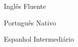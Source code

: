 

\begin{cvskills}

  \cvskill
    {Inglês} %
    {Fluente} %

  \cvskill
    {Português} %
    {Nativo} %

  \cvskill
    {Espanhol} %
    {Intermediário} %

\end{cvskills}